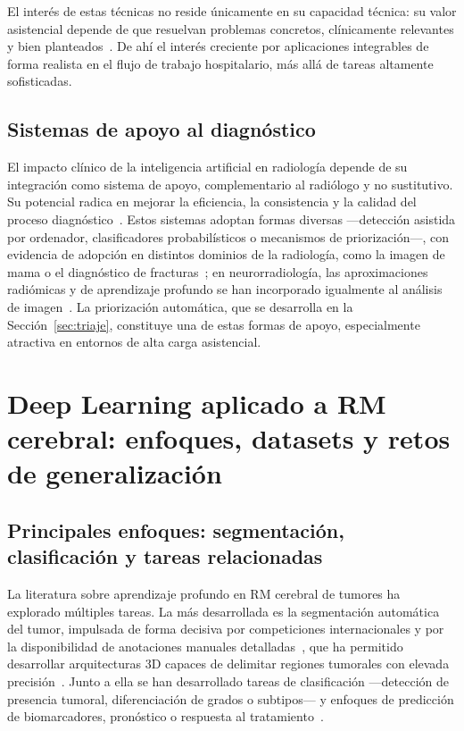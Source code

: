 El interés de estas técnicas no reside únicamente en su capacidad técnica: su
valor asistencial depende de que resuelvan problemas concretos, clínicamente
relevantes y bien planteados~\cite{driver2019radiology}. De ahí el interés
creciente por aplicaciones integrables de forma realista en el flujo de trabajo
hospitalario, más allá de tareas altamente sofisticadas.

\subsection{Sistemas de apoyo al diagnóstico}

El impacto clínico de la inteligencia artificial en radiología depende de su
integración como sistema de apoyo, complementario al radiólogo y no sustitutivo.
Su potencial radica en mejorar la eficiencia, la consistencia y la calidad del
proceso diagnóstico~\cite{sharma2020diagnostic}. Estos sistemas adoptan formas
diversas ---detección asistida por ordenador, clasificadores probabilísticos o
mecanismos de priorización---, con evidencia de adopción en distintos dominios de
la radiología, como la imagen de mama o el diagnóstico de
fracturas~\cite{hickman2021breast,zech2022fracture,yeasmin2024advances}; en
neurorradiología, las aproximaciones radiómicas y de aprendizaje profundo se han
incorporado igualmente al análisis de imagen~\cite{wagner2021radiomics}. La
priorización automática, que se desarrolla en la Sección~\ref{sec:triaje},
constituye una de estas formas de apoyo, especialmente atractiva en entornos de
alta carga asistencial.

\section{Deep Learning aplicado a RM cerebral: enfoques, datasets y retos de generalización}

\subsection{Principales enfoques: segmentación, clasificación y tareas relacionadas}

La literatura sobre aprendizaje profundo en RM cerebral de tumores ha explorado
múltiples tareas. La más desarrollada es la segmentación automática del tumor,
impulsada de forma decisiva por competiciones internacionales y por la
disponibilidad de anotaciones manuales detalladas~\cite{labella2023brats}, que ha
permitido desarrollar arquitecturas 3D capaces de delimitar regiones tumorales
con elevada precisión~\cite{kamnitsas2017deepmedic}. Junto a ella se han
desarrollado tareas de clasificación ---detección de presencia tumoral,
diferenciación de grados o subtipos--- y enfoques de predicción de biomarcadores,
pronóstico o respuesta al tratamiento~\cite{litjens2017survey}.

